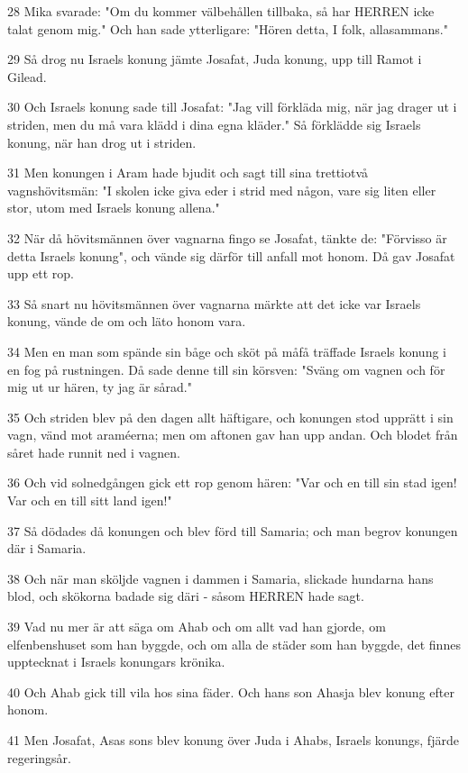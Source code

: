 \par 28 Mika svarade: "Om du kommer välbehållen tillbaka, så har HERREN icke talat genom mig." Och han sade ytterligare: "Hören detta, I folk, allasammans."
\par 29 Så drog nu Israels konung jämte Josafat, Juda konung, upp till Ramot i Gilead.
\par 30 Och Israels konung sade till Josafat: "Jag vill förkläda mig, när jag drager ut i striden, men du må vara klädd i dina egna kläder." Så förklädde sig Israels konung, när han drog ut i striden.
\par 31 Men konungen i Aram hade bjudit och sagt till sina trettiotvå vagnshövitsmän: "I skolen icke giva eder i strid med någon, vare sig liten eller stor, utom med Israels konung allena."
\par 32 När då hövitsmännen över vagnarna fingo se Josafat, tänkte de: "Förvisso är detta Israels konung", och vände sig därför till anfall mot honom. Då gav Josafat upp ett rop.
\par 33 Så snart nu hövitsmännen över vagnarna märkte att det icke var Israels konung, vände de om och läto honom vara.
\par 34 Men en man som spände sin båge och sköt på måfå träffade Israels konung i en fog på rustningen. Då sade denne till sin körsven: "Sväng om vagnen och för mig ut ur hären, ty jag är sårad."
\par 35 Och striden blev på den dagen allt häftigare, och konungen stod upprätt i sin vagn, vänd mot araméerna; men om aftonen gav han upp andan. Och blodet från såret hade runnit ned i vagnen.
\par 36 Och vid solnedgången gick ett rop genom hären: "Var och en till sin stad igen! Var och en till sitt land igen!"
\par 37 Så dödades då konungen och blev förd till Samaria; och man begrov konungen där i Samaria.
\par 38 Och när man sköljde vagnen i dammen i Samaria, slickade hundarna hans blod, och skökorna badade sig däri - såsom HERREN hade sagt.
\par 39 Vad nu mer är att säga om Ahab och om allt vad han gjorde, om elfenbenshuset som han byggde, och om alla de städer som han byggde, det finnes upptecknat i Israels konungars krönika.
\par 40 Och Ahab gick till vila hos sina fäder. Och hans son Ahasja blev konung efter honom.
\par 41 Men Josafat, Asas sons blev konung över Juda i Ahabs, Israels konungs, fjärde regeringsår.
